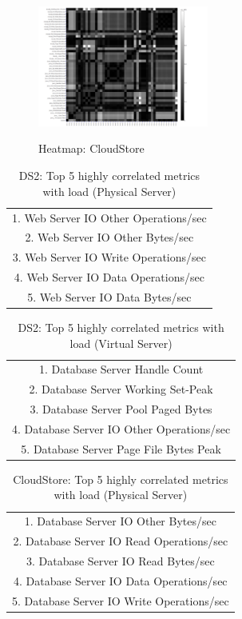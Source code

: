 \begin{figure}[tbh]
	\centering
	{\includegraphics[width=0.5\textwidth]{figures/cloudscale_heatmap.pdf}}
	\caption{Heatmap: CloudStore}
	\label{fig:Results Table}
\end{figure}


\begin{table}[tbh]
		\centering
		\caption{DS2: Top 5 highly correlated metrics with load (Physical Server)}
		\label{resultRQ3}
		\begin{tabular}{c}
			\toprule
			1. Web Server IO Other Operations/sec \\
			2. Web Server IO Other Bytes/sec \\
			3. Web Server IO Write Operations/sec \\
			4. Web Server IO Data Operations/sec \\
			5. Web Server IO Data Bytes/sec \\
			
			\bottomrule             
		\end{tabular}
\end{table}

\begin{table}[tbh]
	\centering
		\caption{DS2: Top 5 highly correlated metrics with load (Virtual Server)}
		\label{resultRQ3}
		\begin{tabular}{c}
			\toprule
			1. Database Server Handle Count \\
			2. Database Server Working Set-Peak \\
			3. Database Server Pool Paged Bytes \\
			4. Database Server IO Other Operations/sec \\
			5. Database Server Page File Bytes Peak \\
			\bottomrule             
		\end{tabular}
\end{table}

\begin{table}[tbh]
	\centering
		\caption{CloudStore: Top 5 highly correlated metrics with load (Physical Server)}
		\label{resultRQ3}
		\begin{tabular}{c}
			\toprule
			1. Database Server IO Other Bytes/sec  \\
			2. Database Server IO Read Operations/sec   \\
			3. Database Server IO Read Bytes/sec \\
			4. Database Server IO Data Operations/sec    \\
			5. Database Server IO Write Operations/sec \\
			\bottomrule             
		\end{tabular}
\end{table}


